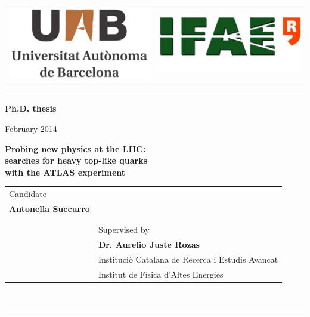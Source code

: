 \documentclass[titlepage]{article}
\begin{document}
\centering
\par
\vspace{6pt}
\begin{tabular}{p{5cm}p{5cm}}
\includegraphics[width=.23\textwidth]{uab_logo}&
\includegraphics[width=.3\textwidth]{ifae_logo}\\
\end{tabular}
\par
\vspace{6pt}
\hrule 
\par
\vspace{6pt}
\par
\begin{large}\textbf{Ph.D. thesis}\\
\par
\vspace{2pt}
\par
February 2014 \\ 
\end{large} 
\vspace{120pt}
{\huge \bfseries Probing new physics at the LHC: } \\
\vspace{6pt}
{\huge \bfseries searches for heavy top-like quarks } \\
\vspace{6pt}
{\huge \bfseries with the ATLAS experiment}
\vspace{180pt} \\
\centering
\begin{tabular}{p{6cm}p{9cm}}
\large Candidate &  \\
\Large \bfseries Antonella Succurro & \\
 & \\
 & \\
 & \large Supervised by \\
 &\Large \bfseries Dr. Aurelio Juste Rozas\\
 &\large Instituciò Catalana de Recerca i Estudis Avancat\\
 &\large Institut de F\'isica d’Altes Energies\\
\end{tabular}
\vspace{120pt} \\
\hrule \vspace{6pt}
\large 
\end{document}

